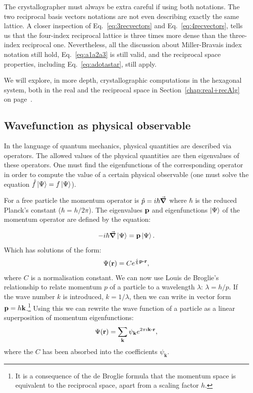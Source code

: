 \label{say:moreDense}
The crystallographer must always be extra careful if using both notations. The two reciprocal basis vectors notations are not even describing exactly the same lattice. A closer inspection of Eq.~\ref{eq:3recvectors} and Eq.~\ref{eq:4recvectors}, tells us that the four-index reciprocal lattice is three times more dense than the three-index reciprocal one. Nevertheless, all the discussion about Miller-Bravais index notation still hold, \ie Eq.~\ref{eq:a1a2a3} is still valid, and the reciprocal space properties, including Eq.~\ref{eq:adotastar}, still apply. 

We will explore, in more depth, crystallographic computations in the hexagonal system, both in the real and the reciprocal space in Section~\ref{chap:real+recAlg} on page~\pageref{chap:real+recAlg}.

\subsection{Wavefunction as physical observable}
\label{sec:wave}
In the language of quantum mechanics, physical quantities are described via operators. The allowed values of the physical quantities are then eigenvalues of these operators. One must find the eigenfunctions of the corresponding operator in order to compute the value of a certain physical observable (\ie one must solve the equation $\hat{f}\ket{\Psi}=f\ket{\Psi}$).

For a free particle the momentum operator is $\hat{p}=i\hbar\grad$ where $\hbar$ is the reduced Planck's constant ($\hbar = h/2\pi$). The eigenvalues $\vb{p}$ and eigenfunctions $\ket{\Psi}$ of the momentum operator are defined by the equation:

\begin{equation*}
-i\hbar\grad \ket{\Psi}=\vb{p}\ket{\Psi}.
\end{equation*}
Which has solutions of the form:
\begin{equation*}
\Psi(\vb{r})=C e^{\frac{i}{\hbar}\vb{p}\vdot\vb{r}},
\end{equation*}
where $C$ is a normalisation constant.  
We can now use Louis de Broglie's relationship to relate momentum $p$ of a particle to a wavelength $\lambda$: $\lambda = h/p$. If the wave number $k$ is introduced, $k=1/\lambda$, then we can write in vector form $\vb{p}=h\vb{k}$.\footnote{ It is a consequence of the de Broglie formula that the momentum space is equivalent to the reciprocal space, apart from a scaling factor $h$.} Using this we can rewrite the wave function of a particle as a linear superposition of momentum eigenfunctions:
\begin{equation}
\label{eq:psi}
\Psi(\vb{r})=\sum_{\vb{k}} \psi_{\vb{k}} e^{2 \pi i \vb{k}\vdot\vb{r}},
\end{equation}
where the $C$ has been absorbed into the coefficients $\psi_\mathbf{k}$.


